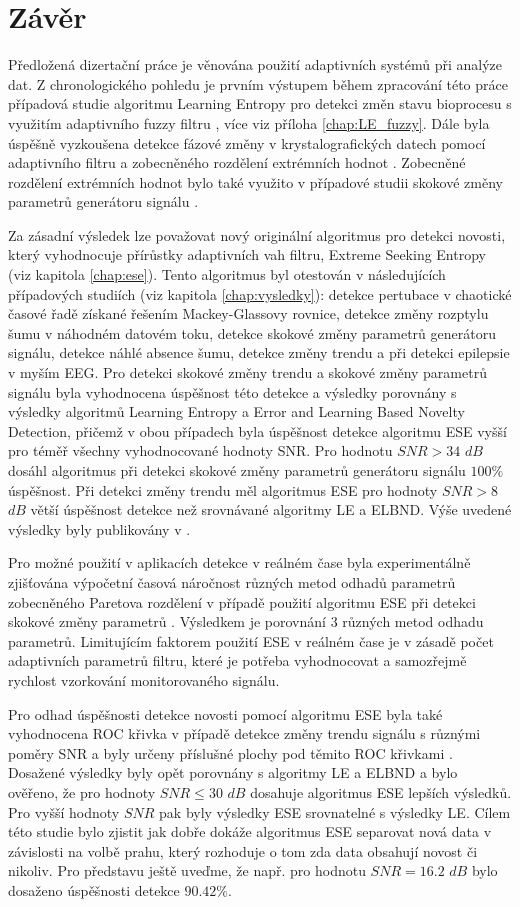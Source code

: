 \chapter{Závěr}
Předložená dizertační práce je věnována použití adaptivních systémů při analýze dat. Z chronologického pohledu je prvním výstupem během zpracování této práce případová studie algoritmu Learning Entropy pro detekci změn stavu bioprocesu s využitím adaptivního fuzzy filtru \cite{artep}, více viz příloha \ref{chap:LE_fuzzy}. Dále byla úspěšně vyzkoušena detekce fázové změny v krystalografických datech pomocí adaptivního filtru a zobecněného rozdělení extrémních hodnot \cite{asr}. Zobecněné rozdělení extrémních hodnot bylo také využito v případové studii skokové změny parametrů generátoru signálu \cite{appel1}. 
\par 
Za zásadní výsledek lze považovat nový originální algoritmus pro detekci novosti, který vyhodnocuje přírůstky adaptivních vah filtru, Extreme Seeking Entropy \cite{ese_mdpi} (viz kapitola \ref{chap:ese}). Tento algoritmus byl otestován v následujících případových studiích (viz kapitola \ref{chap:vysledky}): detekce pertubace v chaotické časové řadě získané řešením Mackey-Glassovy rovnice, detekce změny rozptylu šumu v náhodném datovém toku, detekce skokové změny parametrů generátoru signálu, detekce náhlé absence šumu, detekce změny trendu a při detekci epilepsie v myším EEG. Pro detekci skokové změny trendu a skokové změny parametrů signálu byla vyhodnocena úspěšnost této detekce a výsledky porovnány s výsledky algoritmů Learning Entropy a Error and Learning Based Novelty Detection, přičemž v obou případech byla úspěšnost detekce algoritmu ESE vyšší pro téměř všechny vyhodnocované hodnoty SNR. Pro hodnotu $SNR>34$ $dB$ dosáhl algoritmus při detekci skokové změny parametrů generátoru signálu $100\%$ úspěšnost. Při detekci změny trendu měl algoritmus ESE pro hodnoty $SNR>8$ $dB$ větší úspěšnost detekce než srovnávané algoritmy LE a ELBND. Výše uvedené výsledky byly publikovány v \cite{ese_mdpi}.
\par Pro možné použití v aplikacích detekce v reálném čase byla experimentálně zjišťována výpočetní časová náročnost různých metod odhadů parametrů zobecněného Paretova rozdělení v případě použití algoritmu ESE při detekci skokové změny parametrů \cite{appel2}. Výsledkem je porovnání 3 různých metod odhadu parametrů. Limitujícím faktorem použití ESE v reálném čase je v zásadě počet adaptivních parametrů filtru, které je potřeba vyhodnocovat a samozřejmě rychlost vzorkování monitorovaného signálu.
\par Pro odhad úspěšnosti detekce novosti pomocí algoritmu ESE byla také vyhodnocena ROC křivka v případě detekce změny trendu signálu s různými poměry SNR a byly určeny příslušné plochy pod těmito ROC křivkami \cite{appel3}. Dosažené výsledky byly opět porovnány s algoritmy LE a ELBND a bylo ověřeno, že pro hodnoty $SNR \leq 30$ $dB$ dosahuje algoritmus ESE lepších výsledků. Pro vyšší hodnoty $SNR$ pak byly výsledky ESE srovnatelné s výsledky LE.  Cílem této studie bylo zjistit jak dobře dokáže algoritmus ESE separovat nová data v závislosti na volbě prahu, který rozhoduje o tom zda data obsahují novost či nikoliv. Pro představu ještě uveďme, že např. pro hodnotu $SNR=16.2$ $dB$ bylo dosaženo úspěšnosti detekce $90.42\%$.
